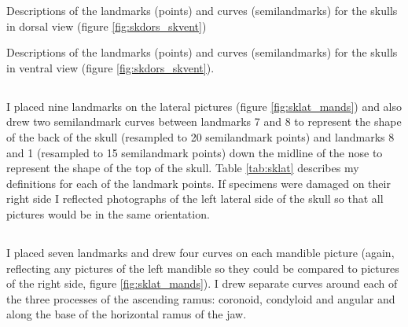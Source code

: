 
\begin{table}[h]
	\caption[Skulls: dorsal landmarks]
		{Descriptions of the landmarks (points) and curves (semilandmarks) for the skulls in dorsal view (figure
		\ref{fig:skdors_skvent})} 
	
	\label{tab:skdors}
\end{table}

\begin{table}[!htb] %
\caption[Skulls: ventral landmarks]
		{Descriptions of the landmarks (points) and curves (semilandmarks) for the skulls in ventral view (figure \ref{fig:skdors_skvent}).} 

\label{tab:skvent}
\end{table}
\newpage
\subsection{}
	I placed nine landmarks on the lateral pictures (figure \ref{fig:sklat_mands}) and also drew two semilandmark curves between landmarks 7 and 8 to represent the shape of the back of the skull (resampled to 20 semilandmark points) and landmarks 8 and 1 (resampled to 15 semilandmark points) down the midline of the nose to represent the shape of the top of the skull. Table \ref{tab:sklat} describes my definitions for each of the landmark points.
	If specimens were damaged on their right side I reflected photographs of the left lateral side of the skull so that all pictures would be in the same orientation.

\subsection{}
	I placed seven landmarks and drew four curves on each mandible picture (again, reflecting any pictures of the left mandible so they could be compared to pictures of the right side, figure \ref{fig:sklat_mands}). I drew separate curves around each of the three processes of the ascending ramus: coronoid, condyloid and angular and along the base of the horizontal ramus of the jaw. 
	




